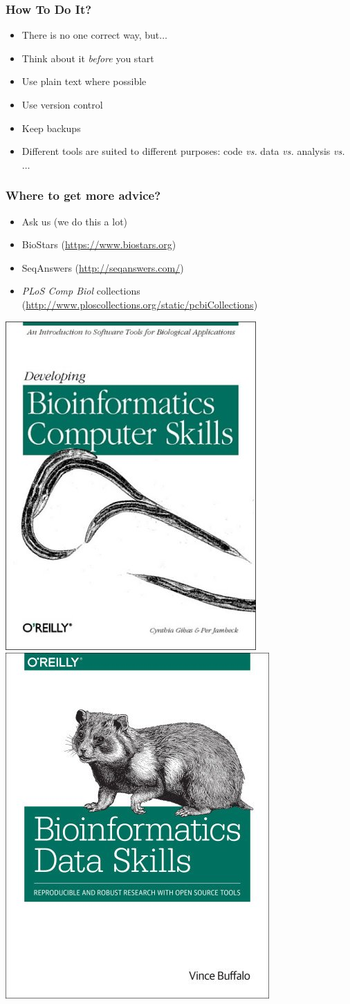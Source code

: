 \documentclass{beamer}
\begin{document}
   \begin{frame}
     \frametitle{How To Do It?}
     \begin{itemize}
	   \item There is no one correct way, but$\ldots$
	   \item Think about it \textit{before} you start
	   \item Use plain text where possible
	   \item Use version control
	   \item Keep backups
	   \item Different tools are suited to different purposes: code \textit{vs.} data \textit{vs.} analysis \textit{vs.} $\ldots$
	\end{itemize}
   \end{frame}
   
   \begin{frame}
     \frametitle{Where to get more advice?}
     \begin{itemize}
	   \item Ask us (we do this a lot)
	   \item BioStars (\url{https://www.biostars.org})
	   \item SeqAnswers (\url{http://seqanswers.com/})
	   \item \textit{PLoS Comp Biol} collections (\url{http://www.ploscollections.org/static/pcbiCollections})
	\end{itemize}
	\includegraphics[width=.2\textwidth]{images/gibas_book}
	\includegraphics[width=.2\textwidth]{images/buffalo_book}
   \end{frame}
   
\end{document}
